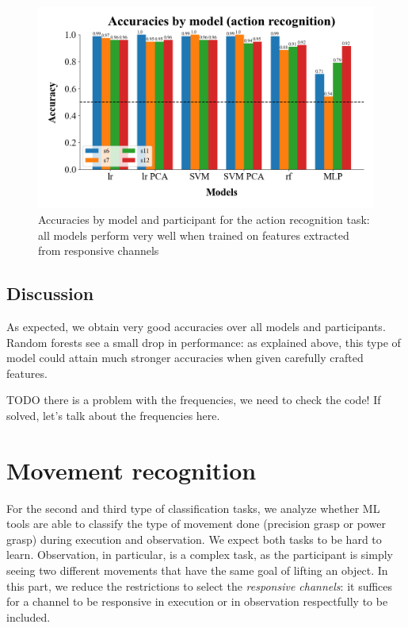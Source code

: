 \documentclass[10pt,conference,compsocconf]{IEEEtran}
\begin{document}
\begin{figure}[h!]
  \center
  \includegraphics[width=\linewidth]{../figures/accuracies_across_part_ExObs.png}
  \caption{Accuracies by model and participant for the action recognition task: all models perform very well when trained on features extracted from responsive channels}
\end{figure}
\FloatBarrier

\subsection{Discussion}
As expected, we obtain very good accuracies over all models and participants. Random forests see a small drop in performance: as explained above, this type of model could attain much stronger accuracies when given carefully crafted features.

TODO there is a problem with the frequencies, we need to check the code! If solved, let's talk about the frequencies here.

\section{Movement recognition}
\label{sec:objectrecognition}
For the second and third type of classification tasks, we analyze whether ML tools are able to classify the type of movement done (precision grasp or power grasp) during execution and observation. We expect both tasks to be hard to learn. Observation, in particular, is a complex task, as the participant is simply seeing two different movements that have the same goal of lifting an object. In this part, we reduce the restrictions to select the \textit{responsive channels}: it suffices for a channel to be responsive in execution or in observation respectfully to be included.
\end{document}
